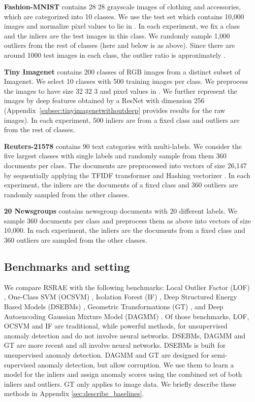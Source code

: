 \documentclass{article} \usepackage{iclr2020_conference,times}
\begin{document}
\textbf{Fashion-MNIST} contains 28  28 grayscale images of clothing and accessories, which are categorized into 10 classes. We use the test set which contains 10,000 images and  normalize pixel values to lie in . In each experiment, we fix a class and the inliers are the test images in this class. We randomly sample   1,000 outliers from the rest of classes (here and below  is as above). Since there are around 1000 test images in each class, the outlier ratio is approximately .

\textbf{Tiny Imagenet} contains 200 classes of RGB images from a distinct subset of Imagenet. We select 10 classes with 500 training images per class. We preprocess the images to have size 32  32  3 and pixel values in . We further represent the images by deep features obtained by a ResNet \citep{he2016identity} with dimension 256 (Appendix~\ref{subsec:tinyimagenetwithoutdeep} provides results for the raw images).
In each experiment, 500 inliers are from a fixed class and  outliers are from the rest of classes. 

\textbf{Reuters-21578} contains 90 text categories with multi-labels. We consider the five largest classes with single labels and randomly sample from them 360 documents per class. The documents are preprocessed into vectors of size 26,147 by sequentially applying the TFIDF transformer and Hashing vectorizer \citep{rajaraman2011mining}. In each experiment, the inliers are the documents of a fixed class and   360 outliers are randomly sampled from the other classes. 

\textbf{20 Newsgroups} contains newsgroup documents with 20 different labels. We sample 360 documents per class and preprocess them as above into vectors of size 10,000.
In each experiment, the inliers are the documents from a fixed class and   360 outliers are sampled from the other classes.


\subsection{Benchmarks and setting}\label{subsec:benchmark}



We compare RSRAE with the following benchmarks: Local Outlier Factor (LOF) \citep{breunig2000lof}, One-Class SVM (OCSVM) \citep{scholkopf2000support, amer2013enhancing}, Isolation Forest (IF) \citep{liu2012isolation}, Deep Structured Energy Based Models (DSEBMs) \citep{zhai2016deep}, Geometric Transformations (GT) \citep{golan2018deep}, and Deep Autoencoding Gaussian Mixture Model (DAGMM) \citep{zong2018deep}. Of those benchmarks, LOF, OCSVM and IF are traditional, while powerful methods, for unsupervised anomaly detection and do not involve neural networks. DSEBMs, DAGMM and GT are more recent and all involve neural networks. DSEBMs is built for unsupervised anomaly detection. DAGMM and GT are designed for semi-supervised anomaly detection, but allow corruption. We use them to learn a model for the inliers and assign anomaly scores using the combined set of both inliers and outliers. GT only applies to image data. We briefly describe these methods in Appendix \ref{sec:describe_baselines}.
\end{document}
